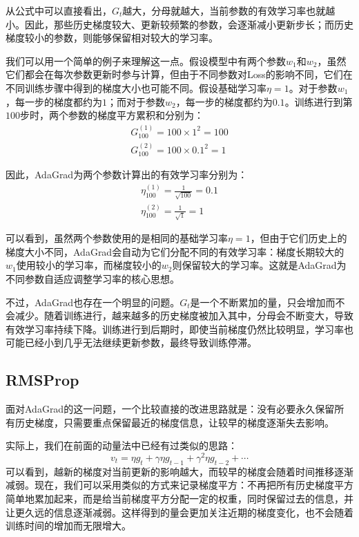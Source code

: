 从公式中可以直接看出，$G_t$越大，分母就越大，当前参数的有效学习率也就越小。因此，那些历史梯度较大、更新较频繁的参数，会逐渐减小更新步长；而历史梯度较小的参数，则能够保留相对较大的学习率。

我们可以用一个简单的例子来理解这一点。假设模型中有两个参数$w_1$和$w_2$，虽然它们都会在每次参数更新时参与计算，但由于不同参数对Loss的影响不同，它们在不同训练步骤中得到的梯度大小也可能不同。假设基础学习率$\eta=1$。对于参数$w_1$，每一步的梯度都约为$1$；而对于参数$w_2$，每一步的梯度都约为$0.1$。训练进行到第$100$步时，两个参数的梯度平方累积和分别为：
$$
\begin{gathered}
G_{100}^{(1)}=100\times1^2=100 \\
G_{100}^{(2)}=100\times0.1^2=1
\end{gathered}
$$

因此，AdaGrad为两个参数计算出的有效学习率分别为：
$$
\begin{gathered}
\eta_{100}^{(1)} = \frac{1}{\sqrt{100}} = 0.1 \\
\eta_{100}^{(2)} = \frac{1}{\sqrt{1}} = 1
\end{gathered}
$$

可以看到，虽然两个参数使用的是相同的基础学习率$\eta=1$，但由于它们历史上的梯度大小不同，AdaGrad会自动为它们分配不同的有效学习率：梯度长期较大的$w_1$使用较小的学习率，而梯度较小的$w_2$则保留较大的学习率。这就是AdaGrad为不同参数自适应调整学习率的核心思想。

不过，AdaGrad也存在一个明显的问题。$G_t$是一个不断累加的量，只会增加而不会减少。随着训练进行，越来越多的历史梯度被加入其中，分母会不断变大，导致有效学习率持续下降。训练进行到后期时，即使当前梯度仍然比较明显，学习率也可能已经小到几乎无法继续更新参数，最终导致训练停滞。

\subsection{RMSProp}

面对AdaGrad的这一问题，一个比较直接的改进思路就是：没有必要永久保留所有历史梯度，只需要重点保留最近的梯度信息，让较早的梯度逐渐失去影响。

实际上，我们在前面的动量法中已经有过类似的思路：
$$
v_t = \eta g_t + \gamma\eta g_{t-1} + \gamma^2\eta g_{t-2} + \cdots
$$
可以看到，越新的梯度对当前更新的影响越大，而较早的梯度会随着时间推移逐渐减弱。现在，我们可以采用类似的方式来记录梯度平方：不再把所有历史梯度平方简单地累加起来，而是给当前梯度平方分配一定的权重，同时保留过去的信息，并让更久远的信息逐渐减弱。这样得到的量会更加关注近期的梯度变化，也不会随着训练时间的增加而无限增大。

